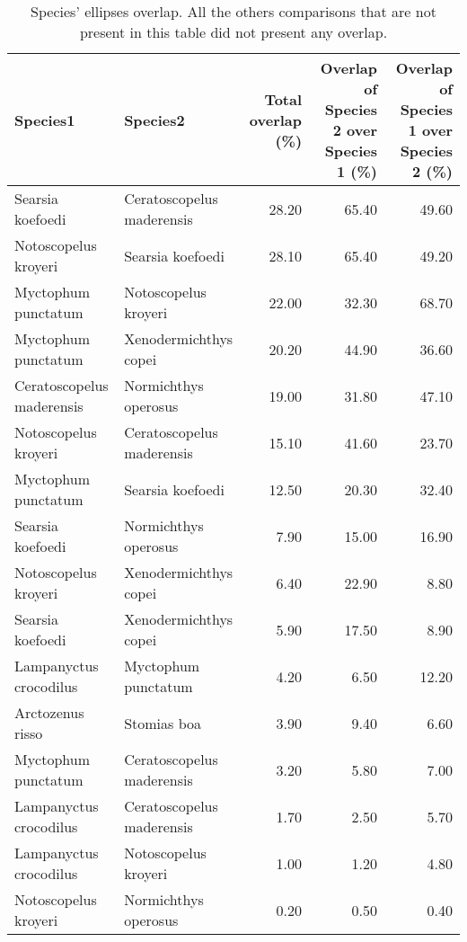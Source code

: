 \begin{table}[!htbp]
\centering
\caption[Overlap of species' ellipses]{Species' ellipses overlap. All the others comparisons that are not present in this table did not present any overlap.}
\label{table:ell_ovlp}
\begin{adjustbox}{max width=1.1\textwidth,center}
\begin{tabular}{llrrr}
  \hline
Species1 & Species2 & Total overlap (\%) &  Overlap of Species 2 over Species 1 (\%) & Overlap of Species 1 over Species 2 (\%) \\ 
  \hline
Searsia koefoedi & Ceratoscopelus maderensis & 28.20 & 65.40 & 49.60 \\ 
  Notoscopelus kroyeri & Searsia koefoedi & 28.10 & 65.40 & 49.20 \\ 
  Myctophum punctatum & Notoscopelus kroyeri & 22.00 & 32.30 & 68.70 \\ 
  Myctophum punctatum & Xenodermichthys copei & 20.20 & 44.90 & 36.60 \\ 
  Ceratoscopelus maderensis & Normichthys operosus & 19.00 & 31.80 & 47.10 \\ 
  Notoscopelus kroyeri & Ceratoscopelus maderensis & 15.10 & 41.60 & 23.70 \\ 
  Myctophum punctatum & Searsia koefoedi & 12.50 & 20.30 & 32.40 \\ 
  Searsia koefoedi & Normichthys operosus & 7.90 & 15.00 & 16.90 \\ 
  Notoscopelus kroyeri & Xenodermichthys copei & 6.40 & 22.90 & 8.80 \\ 
  Searsia koefoedi & Xenodermichthys copei & 5.90 & 17.50 & 8.90 \\ 
  Lampanyctus crocodilus & Myctophum punctatum & 4.20 & 6.50 & 12.20 \\ 
  Arctozenus risso & Stomias boa & 3.90 & 9.40 & 6.60 \\ 
  Myctophum punctatum & Ceratoscopelus maderensis & 3.20 & 5.80 & 7.00 \\ 
  Lampanyctus crocodilus & Ceratoscopelus maderensis & 1.70 & 2.50 & 5.70 \\ 
  Lampanyctus crocodilus & Notoscopelus kroyeri & 1.00 & 1.20 & 4.80 \\ 
  Notoscopelus kroyeri & Normichthys operosus & 0.20 & 0.50 & 0.40 \\ 
   \hline
\end{tabular}
\end{adjustbox}
\end{table}

